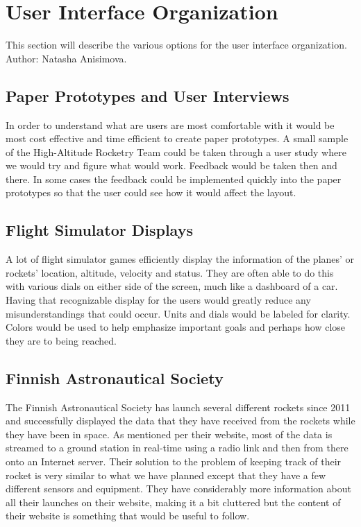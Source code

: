 \documentclass[10pt,draftclsnofoot,onecolumn]{IEEEtran}
\begin{document}
	
	\section{User Interface Organization}
	This section will describe the various options for the user interface organization. Author: Natasha Anisimova.
	
	\subsection{Paper Prototypes and User Interviews}
	In order to understand what are users are most comfortable with it would be most cost effective and time efficient
	to create paper prototypes. 
	A small sample of the High-Altitude Rocketry Team could be taken through a user study where we would try and figure
	what would work. 
	Feedback would be taken then and there.
	In some cases the feedback could be implemented quickly into the paper prototypes so that the user could see how it
	would affect the layout.
	
	\subsection{Flight Simulator Displays}
	A lot of flight simulator games efficiently display the information of the planes' or rockets' location, altitude,
	velocity and status.
	They are often able to do this with various dials on either side of the screen, much like a dashboard of a car.
	Having that recognizable display for the users would greatly reduce any misunderstandings that could occur. 
	Units and dials would be labeled for clarity. 
	Colors would be used to help emphasize important goals and perhaps how close they are to being reached.
	
	\subsection{Finnish Astronautical Society}
	The Finnish Astronautical Society has launch several different rockets since 2011 and successfully displayed the
	data that they have received from the rockets while they have been in space. 
	As mentioned per their website, most of the data is streamed to a ground station in real-time using a radio link and
	then from there onto an Internet server. 
	Their solution to the problem of keeping track of their rocket is very similar to what we have planned except that they
	have a few different sensors and equipment.
	They have considerably more information about all their launches on their website, making it a bit cluttered but the 
	content of their website is something that would be useful to follow.
	
\end{document}
